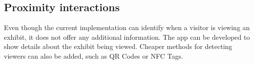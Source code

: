 \subsection{Proximity interactions}
Even though the current implementation can identify when a visitor is viewing an exhibit, it does not offer any additional information. The app can be developed to show details about the exhibit being viewed. Cheaper methods for detecting viewers can also be added, such as QR Codes or NFC Tags. 

